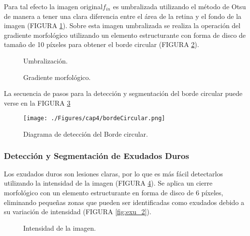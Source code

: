  Para tal efecto la imagen original$f_{in}$ es umbralizada utilizando el método de Otsu de manera a tener una clara diferencia entre el área de la retina y el fondo de la imagen (FIGURA \ref{fig:borde_1}). Sobre esta imagen umbralizada se realiza la operación del gradiente morfológico utilizando un elemento estructurante con forma de disco de tamaño de 10 píxeles para obtener el borde circular (FIGURA \ref{fig:borde_2}). 
 
 \begin{figure}[H]
\centering
{}
\caption{Umbralización.} \label{fig:borde_1}
\end{figure}
 


 \begin{figure}[H]
\centering
{}
\caption{Gradiente morfológico.} \label{fig:borde_2}
\end{figure}

La secuencia de pasos para la detección y segmentación del borde circular puede verse en la FIGURA \ref{fig:bordeCircular}

 \begin{figure}[H]
	\centering
		\texttt{[image: ./Figures/cap4/bordeCircular.png]}
	\caption{Diagrama de detección del Borde circular.}
	\label{fig:bordeCircular}
\end{figure}

\subsubsection{Detección y Segmentación de Exudados Duros}
Los exudados duros son lesiones claras, por lo que es más fácil detectarlos utilizando la intensidad de la imagen (FIGURA \ref{fig:exu_1}).
Se aplica un cierre morfológico con un elemento estructurante en forma de disco de 6 píxeles, eliminando pequeñas zonas que pueden ser identificadas como exudados debido a su variación de intensidad (FIGURA \ref{fig:exu_2}).
\begin{figure}[H]
\centering
{}
\caption{Intensidad de la imagen.} \label{fig:exu_1}
\end{figure}



